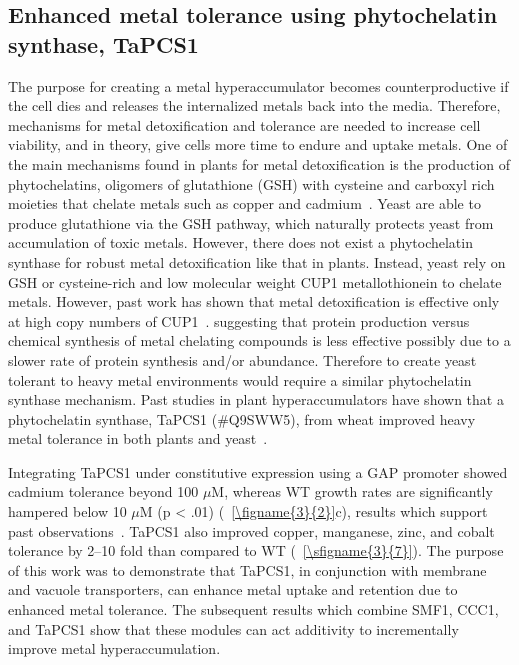 \documentclass[../main/main]{subfiles}
\begin{document}
\subsection{Enhanced metal tolerance using phytochelatin synthase, TaPCS1}
\label{subsection:tapcs1}
The purpose for creating a metal hyperaccumulator becomes counterproductive if the cell dies and releases the internalized metals back into the media. Therefore, mechanisms for metal detoxification and tolerance are needed to increase cell viability, and in theory, give cells more time to endure and uptake metals. One of the main mechanisms found in plants for metal detoxification is the production of phytochelatins, oligomers of glutathione (GSH) with cysteine and carboxyl rich moieties that chelate metals such as copper and cadmium~\cite{kramer2010metal,clemens2002,eapen2005}. Yeast are able to produce glutathione via the GSH pathway, which naturally protects yeast from accumulation of toxic metals. However, there does not exist a phytochelatin synthase for robust metal detoxification like that in plants. Instead, yeast rely on GSH or cysteine-rich and low molecular weight CUP1 metallothionein to chelate metals. However, past work has shown that metal detoxification is effective only at high copy numbers of CUP1~\cite{jeyaprakash1991}. suggesting that protein production versus chemical synthesis of metal chelating compounds is less effective possibly due to a slower rate of protein synthesis and/or abundance. Therefore to create yeast tolerant to heavy metal environments would require a similar phytochelatin synthase mechanism. Past studies in plant hyperaccumulators have shown that a phytochelatin synthase, TaPCS1 (\#{}Q9SWW5), from wheat improved heavy metal tolerance in both plants and yeast~\cite{clemens1999}.

Integrating TaPCS1 under constitutive expression using a GAP promoter showed cadmium tolerance beyond 100 $\mu$M, whereas WT growth rates are significantly hampered below 10 $\mu$M (p < .01) (\FIGURE~\ref{\figname{3}{2}}c), results which support past observations~\cite{clemens1999}. TaPCS1 also improved copper, manganese, zinc, and cobalt tolerance by 2--10 fold than compared to WT (\sFIGURE~\ref{\sfigname{3}{7}}). The purpose of this work was to demonstrate that TaPCS1, in conjunction with membrane and vacuole transporters, can enhance metal uptake and retention due to enhanced metal tolerance. The subsequent results which combine SMF1, CCC1, and TaPCS1 show that these modules can act additivity to incrementally improve metal hyperaccumulation.
\end{document}

